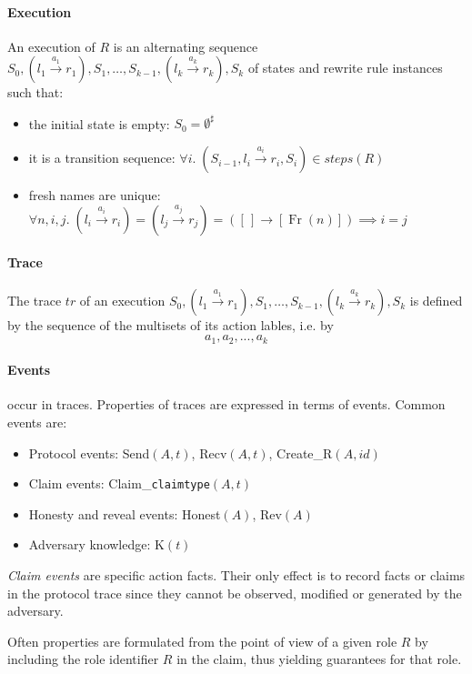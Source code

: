 \paragraph{Execution}
An execution of $R$ is an alternating sequence $S_0, (l_1\xrightarrow{a_1}r_1), S_1,\dots , S_{k-1}, (l_k\xrightarrow{a_k}r_k), S_k$ of states and rewrite rule instances such that:
\begin{itemize}
    \item the initial state is empty:   $S_0=\emptyset^\sharp$
    \item it is a transition sequence:  $\forall i. \; (S_{i-1},l_{i} \xrightarrow{a_i} r_i, S_i)\in steps(R)$
    \item fresh names are unique:       $\forall n, i, j. \; (l_i \xrightarrow{a_i} r_i)=(l_j \xrightarrow{a_j} r_j) = ([\,] \rightarrow [\operatorname{Fr}(n)]) \implies i=j$
\end{itemize}

\paragraph{Trace} The trace $tr$ of an execution $S_0, (l_1\xrightarrow{a_1}r_1), S_1,\dots , S_{k-1}, (l_k\xrightarrow{a_k}r_k), S_k$ is defined by the sequence of the multisets of its action lables, i.e. by
$$ a_1, a_2, ..., a_k$$

\paragraph{Events} occur in traces. Properties of traces are expressed in terms of events. Common events are:
\begin{itemize}
    \item Protocol events: Send$(A,t)$, Recv$(A,t)$, Create\_R$(A,id)$
    \item Claim events: Claim\_\texttt{claimtype}$(A,t)$
    \item Honesty and reveal events: Honest$(A)$, Rev$(A)$
    \item Adversary knowledge: K$(t)$
\end{itemize}

\textit{Claim events} are specific action facts. Their only effect is to record facts or claims in the protocol trace since they cannot be observed, modified or generated by the adversary.

Often properties are formulated from the point of view of a given role $R$ by including the role identifier
$R$ in the claim, thus yielding guarantees for that role. 


